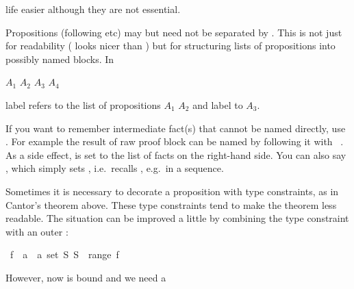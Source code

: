 \begin{isabellebody}
\begin{isamarkuptext}
life easier although they are not essential.%
\end{isamarkuptext}%
\isamarkuptrue%
%
\isamarkuptrue%
%
\begin{isamarkuptext}%
Propositions (following  etc) may but need not be
separated by . This is not just for readability
(    looks nicer than
  ) but for structuring lists of propositions
into possibly named blocks. In
\begin{center}
  $A_1$ $A_2$   $A_3$
 $A_4$
\end{center}
label  refers to the list of propositions $A_1$ $A_2$ and
label  to $A_3$.%
\end{isamarkuptext}%
\isamarkuptrue%
%
\isamarkuptrue%
%
\begin{isamarkuptext}%
If you want to remember intermediate fact(s) that cannot be
named directly, use . For example the result of raw
proof block can be named by following it with
~.  As a side effect,
 is set to the list of facts on the right-hand side. You
can also say , which simply sets ,
i.e.\ recalls , e.g.\ in a  sequence.%
\end{isamarkuptext}%
\isamarkuptrue%
%
\isamarkuptrue%
%
\begin{isamarkuptext}%
Sometimes it is necessary to decorate a proposition with type
constraints, as in Cantor's theorem above. These type constraints tend
to make the theorem less readable. The situation can be improved a
little by combining the type constraint with an outer \isa{{\isasymAnd}}:%
\end{isamarkuptext}%
\isamarkuptrue%
\isamarkupfalse%
\ {\isachardoublequoteopen}{\isasymAnd}f\ {\isacharcolon}{\isacharcolon}\ {\isacharprime}a\ {\isasymRightarrow}\ {\isacharprime}a\ set{\isachardot}\ {\isasymexists}S{\isachardot}\ S\ {\isasymnotin}\ range\ f{\isachardoublequoteclose}%
\isadelimproof
%
\endisadelimproof
%
\isatagproof
%
\endisatagproof
{\isafoldproof}%
%
\isadelimproof
%
\endisadelimproof
%
\begin{isamarkuptext}%
\noindent However, now  is bound and we need a

\end{isamarkuptext}
\end{isabellebody}
